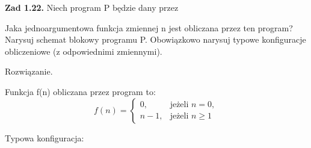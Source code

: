 \documentclass[12pt]{article}
\begin{document}
\newpage

\noindent\textbf{Zad 1.22.} Niech program P będzie dany przez

\vspace{10pt}

\begin{Parallel}{0.1\textwidth}{0.55\textwidth}



\end{Parallel}

\vspace{10pt}

Jaka jednoargumentowa funkcja zmiennej n jest obliczana przez ten program? Narysuj schemat blokowy programu P. Obowiązkowo narysuj typowe konfiguracje obliczeniowe (z odpowiednimi zmiennymi). 

Rozwiązanie.

\vspace{5pt}

Funkcja f(n) obliczana przez program to:
\[ f(n) = 
  \begin{cases}
  	0, & \text{jeżeli } n = 0, \\
  	n - 1, & \text{jeżeli } n \geq 1 
  \end{cases}
\]

\vspace{5pt}

Typowa konfiguracja:

\vspace{5pt}
\end{document}
